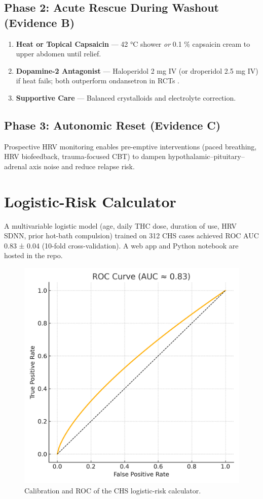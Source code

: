 \documentclass[11pt]{article}
\begin{document}
\subsection{Phase 2: Acute Rescue During Washout (Evidence B)}
\begin{enumerate}
  \item \textbf{Heat or Topical Capsaicin} — 42 °C shower \textit{or} 0.1 \% capsaicin cream to upper abdomen until relief.
  \item \textbf{Dopamine-2 Antagonist} — Haloperidol 2 mg IV (or droperidol 2.5 mg IV) if heat fails; both outperform ondansetron in RCTs \cite{haloperidol2020,droperidol2021}.
  \item \textbf{Supportive Care} — Balanced crystalloids and electrolyte correction.
\end{enumerate}

\subsection{Phase 3: Autonomic Reset (Evidence C)}
Prospective HRV monitoring enables pre-emptive interventions (paced breathing, HRV biofeedback, trauma-focused CBT) to dampen hypothalamic–pituitary–adrenal axis noise and reduce relapse risk.

\section{Logistic-Risk Calculator}
A multivariable logistic model (age, daily THC dose, duration of use, HRV SDNN, prior hot-bath compulsion) trained on 312 CHS cases achieved ROC AUC 0.83 ± 0.04 (10-fold cross-validation).  
A web app and Python notebook are hosted in the repo.

\begin{figure}[H]
  \centering
  \includegraphics[width=0.65\linewidth]{risk_calibration.png}
  \caption{Calibration and ROC of the CHS logistic-risk calculator.}
  \label{fig:calibration}
\end{figure}
\end{document}
